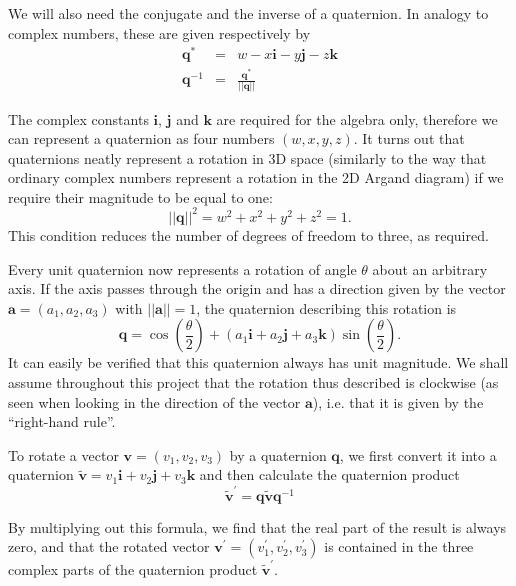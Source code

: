 We will also need the conjugate and the inverse of a quaternion. In analogy to
complex numbers, these are given respectively by
\begin{eqnarray}
\mathbf{q}^\ast & = & w - x\mathbf{i} - y\mathbf{j} - z\mathbf{k}\\
\mathbf{q}^{-1} & = & \frac{\mathbf{q}^\ast}{||\mathbf{q}||}
\end{eqnarray}

The complex constants $\mathbf{i}$, $\mathbf{j}$ and $\mathbf{k}$ are required for the algebra
only, therefore we can represent a quaternion as four numbers $(w,x,y,z)$. It turns out that
quaternions neatly represent a rotation in 3D space (similarly to the way that ordinary complex
numbers represent a rotation in the 2D Argand diagram) if we require their magnitude to be
equal to one:
\begin{equation}
||\mathbf{q}||^2 = w^2 + x^2 + y^2 + z^2 = 1.
\end{equation}
This condition reduces the number of degrees of freedom to three, as required.

Every unit quaternion now represents a rotation of angle $\theta$ about an arbitrary axis.
If the axis passes through the origin and has a direction given by the vector
$\mathbf{a} = (a_1, a_2, a_3)$ with $||\mathbf{a}|| = 1$, the quaternion describing this rotation is
\begin{equation}
\mathbf{q} = \cos\left(\frac{\theta}{2}\right) + (a_1\mathbf{i} + a_2\mathbf{j} +
    a_3\mathbf{k}) \sin\left(\frac{\theta}{2}\right).
\end{equation}
It can easily be verified that this quaternion always has unit magnitude.
We shall assume throughout this project that the rotation thus described is clockwise (as seen
when looking in the direction of the vector $\mathbf{a}$), i.e. that it is given by the
``right-hand rule''.

To rotate a vector $\mathbf{v} = (v_1, v_2, v_3)$ by a quaternion $\mathbf{q}$, we first
convert it into a quaternion $\tilde{\mathbf{v}} = v_1\mathbf{i} + v_2\mathbf{j} + v_3\mathbf{k}$
and then calculate the quaternion product
\begin{equation}
\label{quatTransform}
\tilde{\mathbf{v}}^\prime = \mathbf{q}\tilde{\mathbf{v}}\mathbf{q}^{-1}
\end{equation}

By multiplying out this formula, we find that the real part of the result is always zero, and
that the rotated vector $\mathbf{v}^\prime = (v_1^\prime, v_2^\prime, v_3^\prime)$ is contained
in the three complex parts of the quaternion product $\tilde{\mathbf{v}}^\prime$.

